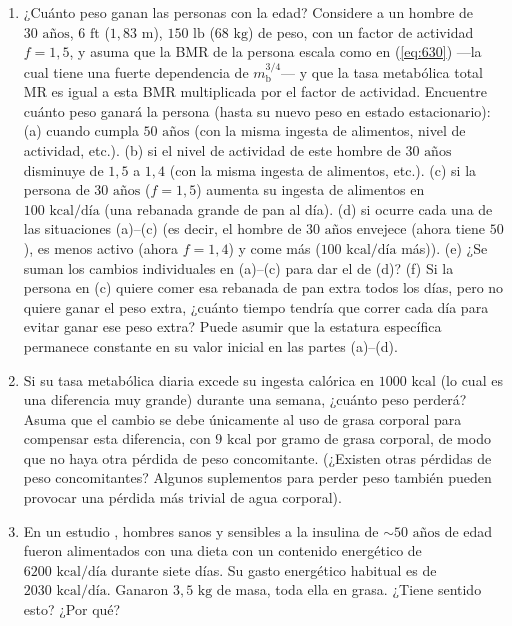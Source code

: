 \documentclass[12pt]{book}
\begin{document}
\begin{enumerate}
\item[6.88] ¿Cuánto peso ganan las personas con la edad? Considere a un hombre de $30\text{ años}$, $6\text{ ft}$ ($1{,}83\text{ m}$), $150\text{ lb}$ ($68\text{ kg}$) de peso, con un factor de actividad $f = 1{,}5$, y asuma que la BMR de la persona escala como en (\ref{eq:630}) ---la cual tiene una fuerte dependencia de $m_{\text{b}}^{3/4}$--- y que la tasa metabólica total MR es igual a esta BMR multiplicada por el factor de actividad. Encuentre cuánto peso ganará la persona (hasta su nuevo peso en estado estacionario): (a) cuando cumpla $50\text{ años}$ (con la misma ingesta de alimentos, nivel de actividad, etc.). (b) si el nivel de actividad de este hombre de $30\text{ años}$ disminuye de $1{,}5$ a $1{,}4$ (con la misma ingesta de alimentos, etc.). (c) si la persona de $30\text{ años}$ ($f = 1{,}5$) aumenta su ingesta de alimentos en $100\text{ kcal/día}$ (una rebanada grande de pan al día). (d) si ocurre cada una de las situaciones (a)--(c) (es decir, el hombre de $30\text{ años}$ envejece (ahora tiene $50$), es menos activo (ahora $f = 1{,}4$) y come más ($100\text{ kcal/día}$ más)). (e) ¿Se suman los cambios individuales en (a)--(c) para dar el de (d)? (f) Si la persona en (c) quiere comer esa rebanada de pan extra todos los días, pero no quiere ganar el peso extra, ¿cuánto tiempo tendría que correr cada día para evitar ganar ese peso extra? Puede asumir que la estatura específica permanece constante en su valor inicial en las partes (a)--(d).

\item[6.89] Si su tasa metabólica diaria excede su ingesta calórica en $1000\text{ kcal}$ (lo cual es una diferencia muy grande) durante una semana, ¿cuánto peso perderá? Asuma que el cambio se debe únicamente al uso de grasa corporal para compensar esta diferencia, con $9\text{ kcal}$ por gramo de grasa corporal, de modo que no haya otra pérdida de peso concomitante. (¿Existen otras pérdidas de peso concomitantes? Algunos suplementos para perder peso también pueden provocar una pérdida más trivial de agua corporal).

\item[6.90] En un estudio \cite{15}, hombres sanos y sensibles a la insulina de $\sim 50\text{ años}$ de edad fueron alimentados con una dieta con un contenido energético de $6200\text{ kcal/día}$ durante siete días. Su gasto energético habitual es de $2030\text{ kcal/día}$. Ganaron $3{,}5\text{ kg}$ de masa, toda ella en grasa. ¿Tiene sentido esto? ¿Por qué?


\end{enumerate}
\end{document}
